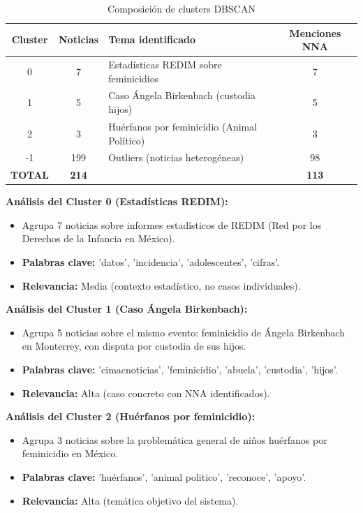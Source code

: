\begin{table}[h]
\centering
\caption{Composición de clusters DBSCAN}
\label{tab:clusters_dbscan}
\begin{tabular}{|c|c|l|c|}
\hline
\textbf{Cluster} & \textbf{Noticias} & \textbf{Tema identificado} & \textbf{Menciones NNA} \\ \hline
0 & 7 & Estadísticas REDIM sobre feminicidios & 7 \\ \hline
1 & 5 & Caso Ángela Birkenbach (custodia hijos) & 5 \\ \hline
2 & 3 & Huérfanos por feminicidio (Animal Político) & 3 \\ \hline
-1 & 199 & Outliers (noticias heterogéneas) & 98 \\ \hline
\textbf{TOTAL} & \textbf{214} & & \textbf{113} \\ \hline
\end{tabular}
\end{table}

\textbf{Análisis del Cluster 0 (Estadísticas REDIM):}
\begin{itemize}
    \item Agrupa 7 noticias sobre informes estadísticos de REDIM (Red por los Derechos de la Infancia en México).
    \item \textbf{Palabras clave:} 'datos', 'incidencia', 'adolescentes', 'cifras'.
    \item \textbf{Relevancia:} Media (contexto estadístico, no casos individuales).
\end{itemize}

\textbf{Análisis del Cluster 1 (Caso Ángela Birkenbach):}
\begin{itemize}
    \item Agrupa 5 noticias sobre el mismo evento: feminicidio de Ángela Birkenbach en Monterrey, con disputa por custodia de sus hijos.
    \item \textbf{Palabras clave:} 'cimacnoticias', 'feminicidio', 'abuela', 'custodia', 'hijos'.
    \item \textbf{Relevancia:} Alta (caso concreto con NNA identificados).
\end{itemize}

\textbf{Análisis del Cluster 2 (Huérfanos por feminicidio):}
\begin{itemize}
    \item Agrupa 3 noticias sobre la problemática general de niños huérfanos por feminicidio en México.
    \item \textbf{Palabras clave:} 'huérfanos', 'animal politico', 'reconoce', 'apoyo'.
    \item \textbf{Relevancia:} Alta (temática objetivo del sistema).
\end{itemize}

